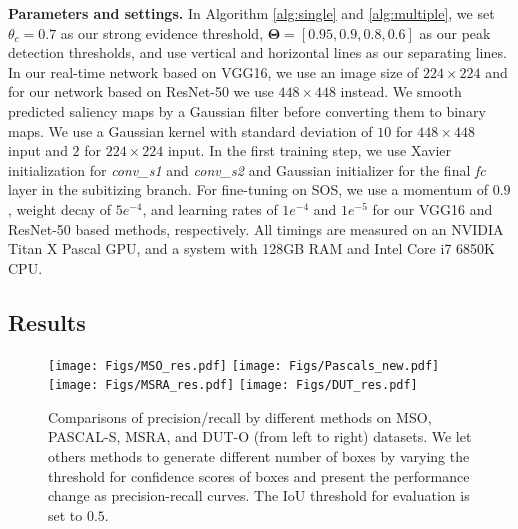 \documentclass[10pt,twocolumn,letterpaper]{article}
\begin{document}
{\flushleft \textbf{Parameters and settings.}} In Algorithm \ref{alg:single} and \ref{alg:multiple}, we set $\theta_c = 0.7$ as our strong evidence threshold, $\mathbf{\Theta} = [0.95,0.9,0.8,0.6]$ as our peak detection thresholds, and use vertical and horizontal lines as our separating lines. 
In our real-time network based on VGG16, we use an image size of $224 \times 224$ and for our network based on ResNet-50 we use $448 \times 448$ instead. We smooth predicted saliency maps by a Gaussian filter before converting them to binary maps. We use a Gaussian kernel with standard deviation of $10$ for $448 \times 448$ input and $2$ for $224 \times 224$ input. 
In the first training step, we use Xavier initialization for \emph{conv\_s1} and \emph{conv\_s2} and Gaussian initializer for the final \emph{fc} layer in the subitizing branch. For fine-tuning on SOS, we use a momentum of $0.9$, weight decay of $5e^{-4}$, and learning rates of $1e^{-4}$ and $1e^{-5}$ for our VGG16 and ResNet-50 based methods, respectively. All timings are measured on an NVIDIA Titan X Pascal GPU, and a system with 128GB RAM and Intel Core i7 6850K CPU.


\subsection{Results}

\begin{figure*}[t]
    \centering
        \texttt{[image: Figs/MSO\_res.pdf]}
        \texttt{[image: Figs/Pascals\_new.pdf]}
        \texttt{[image: Figs/MSRA\_res.pdf]}
        \texttt{[image: Figs/DUT\_res.pdf]}
        \vspace{-2mm}
\caption{{Comparisons of precision/recall by different methods on MSO, PASCAL-S, MSRA, and DUT-O (from left to right) datasets.} 
We let others methods to generate different number of boxes by varying the threshold for confidence scores of boxes and present the performance change as precision-recall curves. The IoU threshold for evaluation is set to $0.5$.}
\label{fig:detection_results}
\end{figure*}
\end{document}
